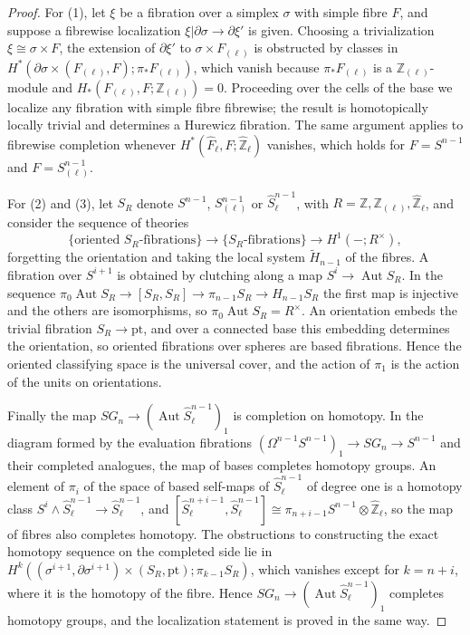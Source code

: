 \documentclass[11pt]{amsart}
\theoremstyle{plain}
\theoremstyle{definition}
\numberwithin{equation}{section}
\newcommand{\Z}{\mathbb{Z}}
\newcommand{\Zhat}{\widehat{\mathbb{Z}}}
\newcommand{\Zl}{\mathbb{Z}_{(\ell)}}
\newcommand{\units}{^{\times}}
\DeclareMathOperator{\Aut}{Aut}
\begin{document}
\begin{proof}
For (1), let $\xi$ be a fibration over a simplex $\sigma$ with simple fibre $F$, and suppose a fibrewise localization $\xi|\partial\sigma\to\partial\xi'$ is given.
Choosing a trivialization $\xi\cong\sigma\times F$, the extension of $\partial\xi'$ to $\sigma\times F_{(\ell)}$ is obstructed by classes in $H^*(\partial\sigma\times(F_{(\ell)},F);\pi_*F_{(\ell)})$, which vanish because $\pi_*F_{(\ell)}$ is a $\Zl$-module and $H_*(F_{(\ell)},F;\Zl)=0$.
Proceeding over the cells of the base we localize any fibration with simple fibre fibrewise; the result is homotopically locally trivial and determines a Hurewicz fibration.
The same argument applies to fibrewise completion whenever $H^*(\widehat F_\ell,F;\Zhat_\ell)$ vanishes, which holds for $F=S^{n-1}$ and $F=S^{n-1}_{(\ell)}$.

For (2) and (3), let $S_R$ denote $S^{n-1}$, $S^{n-1}_{(\ell)}$ or $\widehat S^{n-1}_\ell$, with $R=\Z,\Zl,\Zhat_\ell$, and consider the sequence of theories
\[
\{\text{oriented }S_R\text{-fibrations}\}\to\{S_R\text{-fibrations}\}\to H^1(-;R\units),
\]
forgetting the orientation and taking the local system $\widetilde H_{n-1}$ of the fibres.
A fibration over $S^{i+1}$ is obtained by clutching along a map $S^i\to\Aut S_R$.
In the sequence $\pi_0\Aut S_R\to[S_R,S_R]\to\pi_{n-1}S_R\to H_{n-1}S_R$ the first map is injective and the others are isomorphisms, so $\pi_0\Aut S_R=R\units$.
An orientation embeds the trivial fibration $S_R\to\mathrm{pt}$, and over a connected base this embedding determines the orientation, so oriented fibrations over spheres are based fibrations.
Hence the oriented classifying space is the universal cover, and the action of $\pi_1$ is the action of the units on orientations.

Finally the map $SG_n\to(\Aut\widehat S^{n-1}_\ell)_1$ is completion on homotopy.
In the diagram formed by the evaluation fibrations $(\Omega^{n-1}S^{n-1})_1\to SG_n\to S^{n-1}$ and their completed analogues, the map of bases completes homotopy groups.
An element of $\pi_i$ of the space of based self-maps of $\widehat S^{n-1}_\ell$ of degree one is a homotopy class $S^i\wedge\widehat S^{n-1}_\ell\to\widehat S^{n-1}_\ell$, and $[\widehat S^{n+i-1}_\ell,\widehat S^{n-1}_\ell]\cong\pi_{n+i-1}S^{n-1}\otimes\Zhat_\ell$, so the map of fibres also completes homotopy.
The obstructions to constructing the exact homotopy sequence on the completed side lie in $H^k((\sigma^{i+1},\partial\sigma^{i+1})\times(S_R,\mathrm{pt});\pi_{k-1}S_R)$, which vanishes except for $k=n+i$, where it is the homotopy of the fibre.
Hence $SG_n\to(\Aut\widehat S^{n-1}_\ell)_1$ completes homotopy groups, and the localization statement is proved in the same way.
\end{proof}
\end{document}
